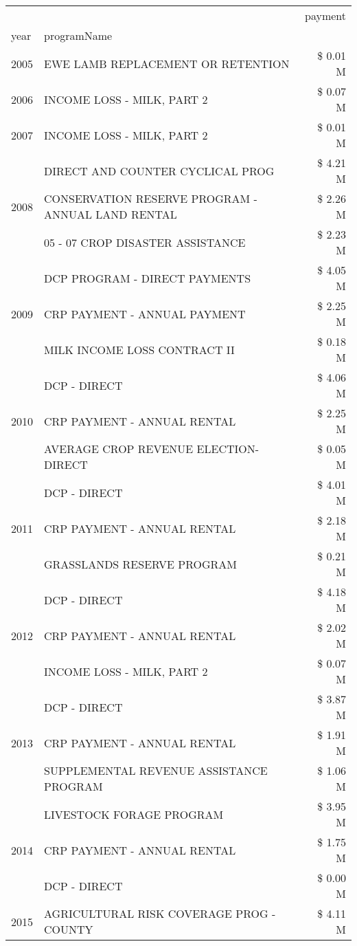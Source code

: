 \begin{tabular}{llr}
\toprule
 &  & payment \\
year & programName &  \\
\midrule
2005 & EWE LAMB REPLACEMENT OR RETENTION & \$ 0.01 M \\
\cline{1-3}
2006 & INCOME LOSS - MILK, PART 2 & \$ 0.07 M \\
\cline{1-3}
2007 & INCOME LOSS - MILK, PART 2 & \$ 0.01 M \\
\cline{1-3}
\multirow[t]{3}{*}{2008} & DIRECT AND COUNTER CYCLICAL PROG & \$ 4.21 M \\
 & CONSERVATION RESERVE PROGRAM - ANNUAL LAND RENTAL & \$ 2.26 M \\
 & 05 - 07 CROP DISASTER ASSISTANCE & \$ 2.23 M \\
\cline{1-3}
\multirow[t]{3}{*}{2009} & DCP PROGRAM - DIRECT PAYMENTS & \$ 4.05 M \\
 & CRP PAYMENT - ANNUAL PAYMENT & \$ 2.25 M \\
 & MILK INCOME LOSS CONTRACT II & \$ 0.18 M \\
\cline{1-3}
\multirow[t]{3}{*}{2010} & DCP - DIRECT & \$ 4.06 M \\
 & CRP PAYMENT - ANNUAL RENTAL & \$ 2.25 M \\
 & AVERAGE CROP REVENUE ELECTION-DIRECT & \$ 0.05 M \\
\cline{1-3}
\multirow[t]{3}{*}{2011} & DCP - DIRECT & \$ 4.01 M \\
 & CRP PAYMENT - ANNUAL RENTAL & \$ 2.18 M \\
 & GRASSLANDS RESERVE PROGRAM & \$ 0.21 M \\
\cline{1-3}
\multirow[t]{3}{*}{2012} & DCP - DIRECT & \$ 4.18 M \\
 & CRP PAYMENT - ANNUAL RENTAL & \$ 2.02 M \\
 & INCOME LOSS - MILK, PART 2 & \$ 0.07 M \\
\cline{1-3}
\multirow[t]{3}{*}{2013} & DCP - DIRECT & \$ 3.87 M \\
 & CRP PAYMENT - ANNUAL RENTAL & \$ 1.91 M \\
 & SUPPLEMENTAL REVENUE ASSISTANCE PROGRAM & \$ 1.06 M \\
\cline{1-3}
\multirow[t]{3}{*}{2014} & LIVESTOCK FORAGE PROGRAM & \$ 3.95 M \\
 & CRP PAYMENT - ANNUAL RENTAL & \$ 1.75 M \\
 & DCP - DIRECT & \$ 0.00 M \\
\cline{1-3}
\multirow[t]{3}{*}{2015} & AGRICULTURAL RISK COVERAGE PROG - COUNTY & \$ 4.11 M \\

\end{tabular}
